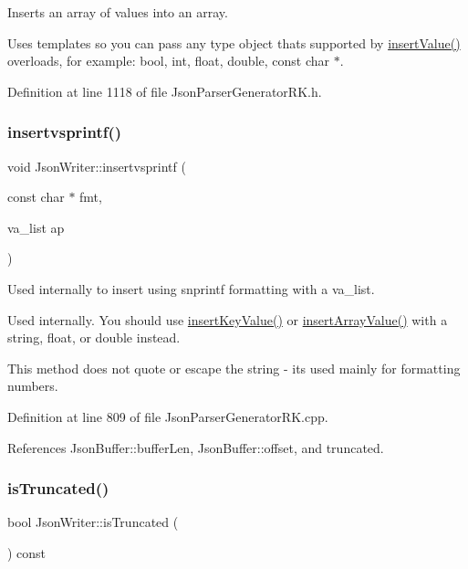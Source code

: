 Inserts an array of values into an array. 

Uses templates so you can pass any type object that\textquotesingle{}s supported by \hyperlink{class_json_writer_ac58734c238ba7be066838591b0cc7743}{insert\+Value()} overloads, for example\+: bool, int, float, double, const char $\ast$. 

Definition at line 1118 of file Json\+Parser\+Generator\+R\+K.\+h.

\mbox{\label{class_json_writer_ab737d9527845638e08bd71034d419e49}} 
\subsubsection{\texorpdfstring{insertvsprintf()}{insertvsprintf()}}
{\footnotesize\ttfamily void Json\+Writer\+::insertvsprintf (\begin{DoxyParamCaption}\item[{const char $\ast$}]{fmt,  }\item[{va\+\_\+list}]{ap }\end{DoxyParamCaption})}



Used internally to insert using snprintf formatting with a va\+\_\+list. 

Used internally. You should use \hyperlink{class_json_writer_ac2de627389b59ce2c8ed95e10ea213bf}{insert\+Key\+Value()} or \hyperlink{class_json_writer_a8b4dc6726b66b4f277c7674e60c8a057}{insert\+Array\+Value()} with a string, float, or double instead.

This method does not quote or escape the string -\/ it\textquotesingle{}s used mainly for formatting numbers. 

Definition at line 809 of file Json\+Parser\+Generator\+R\+K.\+cpp.



References Json\+Buffer\+::buffer\+Len, Json\+Buffer\+::offset, and truncated.

\mbox{\label{class_json_writer_a815f77b2db3315bfd40dfb61f68b0ed4}} 
\subsubsection{\texorpdfstring{is\+Truncated()}{isTruncated()}}
{\footnotesize\ttfamily bool Json\+Writer\+::is\+Truncated (\begin{DoxyParamCaption}{ }\end{DoxyParamCaption}) const\hspace{0.3cm}{\ttfamily [inline]}}

